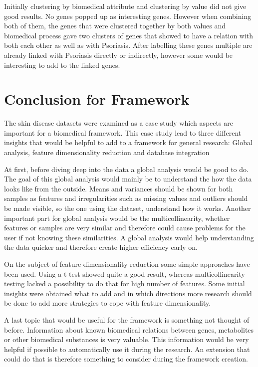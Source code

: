 \documentclass[10pt,a4paper]{article}
\begin{document}
	Initially clustering by biomedical attribute and clustering by value did not give good results. No genes popped up as interesting genes. However when combining both of them, the genes that were clustered together by both values and biomedical process gave two clusters of genes that showed to have a relation with both each other as well as with Psoriasis. After labelling these genes multiple are already linked with Psoriasis directly or indirectly, however some would be interesting to add to the linked genes.
	
	
	\section{Conclusion for Framework}
	\label{sec:DiscussionForFramework}
	
	The skin disease datasets were examined as a case study which aspects are important for a biomedical framework. This case study lead to three different insights that would be helpful to add to a framework for general research: Global analysis, feature dimensionality reduction and database integration
	
	At first, before diving deep into the data a global analysis would be good to do. The goal of this global analysis would mainly be to understand the how the data looks like from the outside. Means and variances should be shown for both samples as features and irregularities such as missing values and outliers should be made visible, so the one using the dataset, understand how it works. Another important part for global analysis would be the multicollinearity, whether features or samples are very similar and therefore could cause problems for the user if not knowing these similarities. A global analysis would help understanding the data quicker and therefore create higher efficiency early on.
	
	On the subject of feature dimensionality reduction some simple approaches have been used. Using a t-test showed quite a good result, whereas multicollinearity testing lacked a possibility to do that for high number of features. Some initial insights were obtained what to add and in which directions more research should be done to add more strategies to cope with feature dimensionality.
	
	A last topic that would be useful for the framework is something not thought of before. Information about known biomedical relations between genes, metabolites or other biomedical substances is very valuable. This information would be very helpful if possible to automatically use it during the research. An extension that could do that is therefore something to consider during the framework creation. 
		
\end{document}
